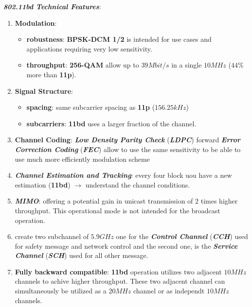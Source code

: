 \textbf{\textit{802.11bd Technical Features}}:
\begin{enumerate}[nosep]

    \item \textbf{Modulation}:
    \begin{itemize}[nosep]
        \item \textbf{robustness}: \textbf{BPSK-DCM 1/2} is intended for use cases and applications requiring very low sensitivity.
        \item \textbf{throughput}: \textbf{256-QAM} allow up to $39Mbit/s$ in a single $10MHz$ ($44\%$ more than \textbf{11p}).
    \end{itemize}

    \item \textbf{Signal Structure}:
    \begin{itemize}[nosep]
        \item \textbf{spacing}: same subcarrier spacing as \textbf{11p} ($156.25kHz$)
        \item \textbf{subcarriers}: \textbf{11bd} uses a larger fraction of the channel.
    \end{itemize}

    \item \textbf{Channel Coding}: \textbf{\textit{Low Density Parity Check}} (\textbf{\textit{LDPC}}) forward \textbf{\textit{Error Correction Coding}} (\textbf{\textit{FEC}}) allow to use the same sensitivity to be able to use much more efficiently modulation scheme

    \item \textbf{\textit{Channel Estimation and Tracking}}: every four block uou have a new estimation (\textbf{11bd}) $\rightarrow$ understand the channel conditions.

    \item \textbf{\textit{MIMO}}: offering a potential gain in unicast transmission of 2 times higher throughput. This operational mode is not intended for the broadcast operation.

    \item create two subchannel of $5.9GHz$ one for the \textbf{\textit{Control Channel}} (\textbf{\textit{CCH}}) used for safety message and network control and the second one, is the \textbf{\textit{Service Channel}} (\textbf{\textit{SCH}}) used for all other message.

    \item \textbf{Fully backward compatible}: \textbf{11bd} operation utilizes two adjacent $10MHz$ channels to achive higher throughput. These two adjacent channel can simultaneously be utilized as a $20MHz$ channel or as independt $10MHz$ channels.


\end{enumerate}
